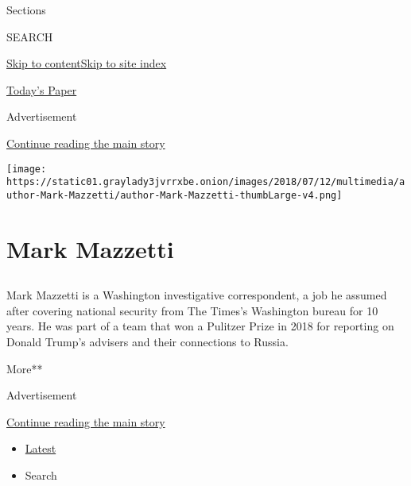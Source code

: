Sections

SEARCH

\protect\hyperlink{site-content}{Skip to
content}\protect\hyperlink{site-index}{Skip to site index}

\href{https://myaccount.nytimes3xbfgragh.onion/auth/login?response_type=cookie\&client_id=vi}{}

\href{https://www.nytimes3xbfgragh.onion/section/todayspaper}{Today's
Paper}

Advertisement

\protect\hyperlink{after-top}{Continue reading the main story}

\texttt{[image: https://static01.graylady3jvrrxbe.onion/images/2018/07/12/multimedia/author-Mark-Mazzetti/author-Mark-Mazzetti-thumbLarge-v4.png]}

\hypertarget{mark-mazzetti}{%
\section{Mark Mazzetti}\label{mark-mazzetti}}

\subsection{}

Mark Mazzetti is a Washington investigative correspondent, a job he
assumed after covering national security from The Times's Washington
bureau for 10 years. He was part of a team that won a Pulitzer Prize in
2018 for reporting on Donald Trump's advisers and their connections to
Russia.

More**

Advertisement

\protect\hyperlink{after-mid1}{Continue reading the main story}

\begin{itemize}
\tightlist
\item
  \protect\hyperlink{stream-panel}{Latest}
\item
  Search
\end{itemize}

